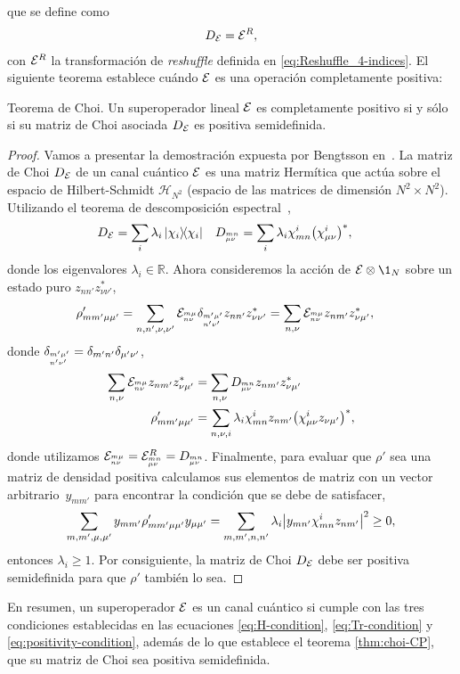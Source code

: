 que se define como~\cite{bengtsson_zyczkowski_2017}
\begin{align}\label{eq:ChoiMatrix-via-reshuffle}
D_{\mathcal{E}}=\mathcal{E}^{R},
\end{align}
con $\mathcal{E}^R$ la transformación de \textit{reshuffle} definida en 
\eqref{eq:Reshuffle_4-indices}. El siguiente teorema establece 
cuándo $\mathcal{E}$ es una operación completamente positiva:
\begin{thm}{Teorema de Choi.}\label{thm:choi-CP}
Un superoperador lineal $\mathcal{E}$ es completamente positivo si y sólo si 
su matriz de Choi asociada $D_{\mathcal{E}}$ es positiva semidefinida.
\end{thm}
\begin{proof}
Vamos a presentar la demostración expuesta por Bengtsson
en~\cite[p. 281]{bengtsson_zyczkowski_2017}.
La matriz de Choi $D_{\mathcal{E}}$ de un 
canal cuántico $\mathcal{E}$ es una matriz Hermítica que 
actúa sobre el espacio de Hilbert-Schmidt $\mathcal{H}_{N^2}$
(espacio de las matrices de dimensión $N^2\times N^2$). 
Utilizando el teorema de descomposición 
espectral~\cite{nielsen_chuang_2011},
\begin{align}
D_{\E}&=\sum_{i}\lambda_i\dyad{\chi_i}{\chi_i}
&
D_{\ind{mn}{\mu\nu}}&=\sum_i\lambda_i
\chi^i_{mn}\qty(\chi_{\mu\nu}^i)^*,
\end{align}
donde los eigenvalores $\lambda_i\in\mathbb{R}$. Ahora consideremos
la acción de $\E\ot \1_N$ sobre un estado puro $z_{nn'}z^*_{\nu\nu'}$,
\begin{align}
\rho'_{mm'\mu\mu'}&=
\sum_{n,n',\nu,\nu'}
\mathcal{E}_{{{}^{m\mu}_{n\nu}}}\delta_{{{}^{m'\mu'}_{n'	\nu'}}}z_{nn'}z^*_{\nu\nu'}
=
\sum_{n,\nu}
\mathcal{E}_{{{}^{m\mu}_{n\nu}}}z_{nm'}z^*_{\nu\mu'},
\end{align}
donde $\delta_{{{}^{m'\mu'}_{n'	\nu'}}}=\delta_{m'n'}\delta_{\mu'\nu'}$,
\begin{align}
\sum_{n,\nu}\mathcal{E}_{{{}^{m\mu}_{n\nu}}}z_{nm'}z^*_{\nu\mu'}&=
\sum_{n,\nu}D_{{{}^{mn}_{\mu\nu}}}z_{nm'}z^*_{\nu\mu'}\nonumber\\
\rho'_{mm'\mu\mu'}&=
\sum_{n,\nu,i}\lambda_{i}
\chi^i_{mn}z_{nm'}\qty(\chi_{\mu\nu}^iz_{\nu\mu'})^*,
\end{align}
donde utilizamos $\mathcal{E}_{{{}^{m\mu}_{n\nu}}}
=\mathcal{E}^R_{{{}^{mn}_{\mu\nu}}}
=D_{{{}^{mn}_{\mu\nu}}}$.
Finalmente, para evaluar que $\rho'$ sea una matriz de densidad positiva 
calculamos sus elementos de matriz con un vector arbitrario~$y_{mm'}$
para encontrar la condición que se debe de satisfacer,
\begin{align}
\sum_{m,m',\mu,\mu'}
y_{mm'}\rho'_{mm'\mu\mu'}y_{\mu\mu'}=
\sum_{m,m',n,n'}\lambda_i\abs{
y_{mn'}\chi^i_{mn}z_{nm'}}^2
\geq0,
\end{align}
entonces $\lambda_i\geq1$. Por consiguiente, la matriz 
de Choi $D_{\mathcal{E}}$ debe ser positiva semidefinida para que $\rho'$ 
también lo sea.
\end{proof}
En resumen, un superoperador $\mathcal{E}$ es un canal cuántico si 
cumple con las tres condiciones establecidas en las ecuaciones 
\eqref{eq:H-condition}, \eqref{eq:Tr-condition}
y \eqref{eq:positivity-condition}, además de lo que establece 
el teorema \ref{thm:choi-CP}, que su matriz de Choi sea 
positiva semidefinida.

